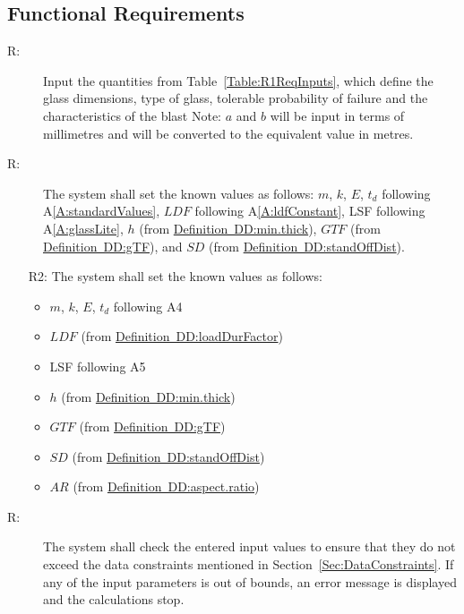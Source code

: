 \documentclass[12pt]{article}
\newcounter{reqnum}
\newcommand{\rthereqnum}{R\thereqnum}
\begin{document}
\subsection{Functional Requirements}
\label{Sec:FRs}
\begin{description}
\item[\rthereqnum\label{FR:Input-Glass-Props}:]Input the quantities from Table~\ref{Table:R1ReqInputs}, which define the glass dimensions, type of glass, tolerable probability of failure and the characteristics of the blast Note: $a$ and $b$ will be input in terms of millimetres and will be converted to the equivalent value in metres.
\end{description}
\begin{description}
\item[\rthereqnum\label{FR:System-Set-Values-Following-Assumptions}:]The system shall set the known values as follows: $m$, $k$, $E$, ${t_{d}}$ following A\ref{A:standardValues}, $LDF$ following A\ref{A:ldfConstant}, LSF following A\ref{A:glassLite}, $h$ (from \hyperref[DD:min.thick]{Definition~DD:min.thick}), $GTF$ (from \hyperref[DD:gTF]{Definition~DD:gTF}), and $SD$ (from \hyperref[DD:standOffDist]{Definition~DD:standOffDist}).
\end{description}
\begin{itemize}
\item[R2:]The system shall set the known values as follows:
          \begin{itemize}
          \item{$m$, $k$, $E$, ${t_{d}}$ following A4}
          \item{$LDF$ (from \hyperref[DD:loadDurFactor]{Definition~DD:loadDurFactor})}
          \item{LSF following A5}
          \item{$h$ (from \hyperref[DD:min.thick]{Definition~DD:min.thick})}
          \item{$GTF$ (from \hyperref[DD:gTF]{Definition~DD:gTF})}
          \item{$SD$ (from \hyperref[DD:standOffDist]{Definition~DD:standOffDist})}
          \item{$AR$ (from \hyperref[DD:aspect.ratio]{Definition~DD:aspect.ratio})}
          \end{itemize}
\end{itemize}
\begin{description}
\item[\rthereqnum\label{FR:Check-Input-with-Data.Constraints}:]The system shall check the entered input values to ensure that they do not exceed the data constraints mentioned in Section~\ref{Sec:DataConstraints}. If any of the input parameters is out of bounds, an error message is displayed and the calculations stop.
\end{description}
\end{document}
